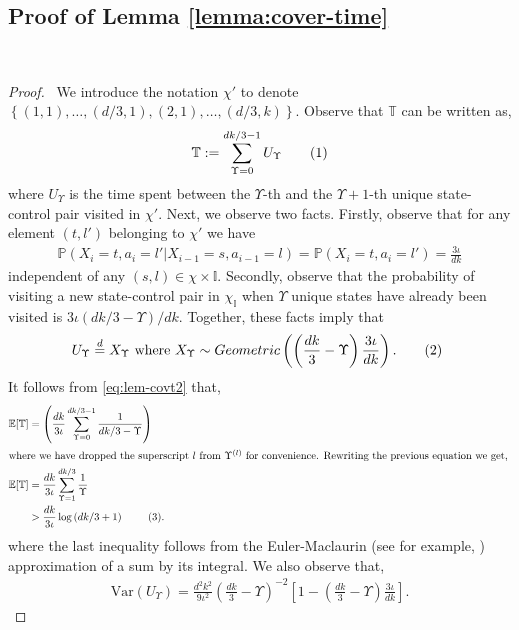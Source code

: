 \documentclass[opre,sglanonrev]{informs4}
\numberwithin{equation}{section}
\newcommand{\pow}[1]{^{(#1)}}
\newcommand{\lp}{\left(}
\newcommand{\rp}{\right)}
\newcommand{\lc}{\left\{}
\newcommand{\rc}{\right\}}
\newcommand{\lb}{\left[}
\newcommand{\rb}{\right]}
\newcommand{\Var}{\mathrm{Var}}
\newcommand{\Ibb}{\mathbb{I}}
\newcommand{\Pbb}{\mathbb{P}}
\newcommand{\Tbb}{\mathbb{T}}
\newcommand\numberthis{\addtocounter{equation}{1}\tag{\theequation}}
\newcommand{\prob}{\Pbb}
\newcommand{\expec}{\mathbb{E}}
\begin{document}
\begin{APPENDICES}
\subsection{Proof of Lemma \ref{lemma:cover-time}}~\label{sec:prf-cvrtm}
\begin{proof}\ 
We introduce the notation $\chi'$ to denote $\lc(1,1),\dots,(d/3,1),(2,1),\dots,(d/3,k) \rc$. Observe that $ \Tbb$ can be written as,
\begin{align*}
    \Tbb:=\sum_{\Upsilon=0}^{dk/3-1} U_\Upsilon\numberthis\label{eq:lem-covt1}
\end{align*}
where $U_\Upsilon$ is the time spent between the $\Upsilon$-th and the $\Upsilon+1$-th unique state-control pair visited in $\chi'$.
Next, we observe two facts. Firstly, observe that for any element $(t,l')$ belonging to $\chi'$ we have
\begin{align*}
    \prob\lp X_i=t,a_i=l'|X_{i-1}=s,a_{i-1}=l \rp= \prob\lp X_i=t,a_i=l' \rp=\frac{3\iota}{dk}
\end{align*}
independent of any $(s,l)\in\chi\times\Ibb$. 
Secondly, observe that the probability of visiting a new state-control pair in $\chi_\Ibb$ when $\Upsilon$ unique states have already been visited is ${3\iota\lp{dk}/{3}-\Upsilon\rp}/dk$.
Together, these facts imply that
\begin{align*}
    U_\Upsilon\overset{d}{=}X_\Upsilon \text{ where } X_\Upsilon\sim Geometric\lp\lp\frac{dk}{3}-\Upsilon\rp\frac{3\iota}{dk} \rp.\numberthis~\label{eq:lem-covt2}
\end{align*}
It follows from \cref{eq:lem-covt2} that, 
\begin{align*}
    \expec[\Tbb] & = \lp \frac{dk}{3\iota}\sum_{ \Upsilon=0}^{dk/3-1}\frac{1}{dk/3-\Upsilon}\rp\\
    \intertext{where we have dropped the superscript $l$ from $\Upsilon\pow{l}$ for convenience. Rewriting the previous equation we get, }
     \expec[\Tbb] & = \frac{dk}{3\iota}\sum_{ \Upsilon=1}^{dk/3}\frac{1}{\Upsilon}\\
    & > \frac{dk}{3\iota}\log\lp dk/3+1\rp~\numberthis\label{eq:lem-covt4}.
\end{align*}
where the last inequality follows from the Euler-Maclaurin (see for example, \citet{apostol1999elementary}) approximation of a sum by its integral.
We also observe that,
\begin{align*}
    \Var(U_\Upsilon)=\frac{d^2k^2}{9\iota^2}\lp\frac{dk}{3}-\Upsilon\rp^{-2}\lb1-\lp\frac{dk}{3}-\Upsilon\rp\frac{3\iota}{dk} \rb.
\end{align*}

\end{proof}
\end{APPENDICES}
\end{document}
